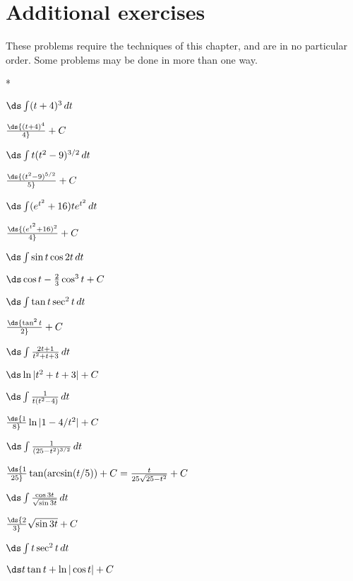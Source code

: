 \section{Additional exercises}{}{}
\nobreak
These problems require the techniques of this chapter, and are in no
particular order. Some problems may be done in more than one way.

\nobreak
\begin{exercises}*

\twocol

\exercise $\ds\int (t+4)^3\,dt$
\begin{answer} $\ds{(t+4)^4\over4}+C$
\end{answer}

\exercise $\ds\int t(t^2-9)^{3/2}\,dt$
\begin{answer} $\ds{(t^2-9)^{5/2}\over5}+C$
\end{answer}

\exercise $\ds\int (e^{t^2}+16)te^{t^2}\,dt$
\begin{answer} $\ds{(e^{t^2}+16)^2\over 4}+C$
\end{answer}

\exercise $\ds\int \sin t\cos 2t\,dt$
\begin{answer} $\ds\cos t-{2\over3}\cos^3 t+C$
\end{answer}

\exercise $\ds\int \tan t\sec^2t\,dt$
\begin{answer} $\ds{\tan^2 t\over 2}+C$
\end{answer}

\exercise $\ds\int {2t+1\over t^2+t+3}\,dt$
\begin{answer} $\ds\ln|t^2+t+3|+C$
\end{answer}

\exercise $\ds\int {1\over t(t^2-4)}\,dt$
\begin{answer} $\ds {1\over8} \ln|1-4/t^2|+C$
\end{answer}

\exercise $\ds\int {1\over (25-t^2)^{3/2}}\,dt$
\begin{answer} $\ds{1\over25}\tan(\arcsin(t/5))+C={t\over25\sqrt{25-t^2}}+C$
\end{answer}

\exercise $\ds\int {\cos 3t\over\sqrt{\sin3t}}\,dt$
\begin{answer} $\ds{2\over3}\sqrt{\sin 3t}+C$
\end{answer}

\exercise $\ds\int t\sec^2 t\,dt$
\begin{answer} $\ds t\tan t+\ln|\cos t|+C$
\end{answer}


\end{exercises}
